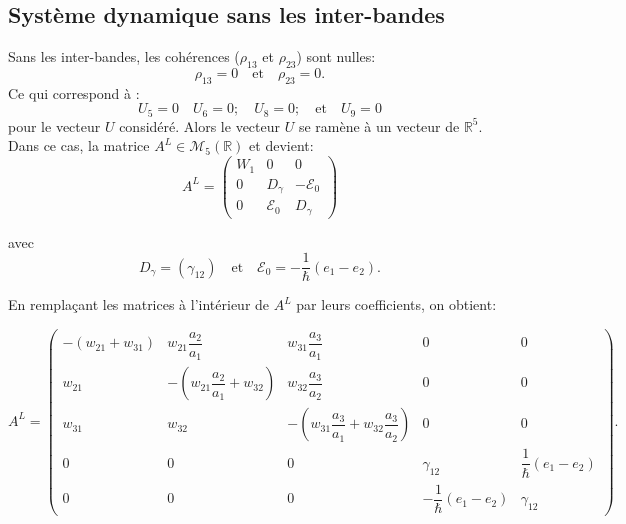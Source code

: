 \documentclass[12pt,a4paper,openany,oneside]{book}
\begin{document}
{{{{{{\subsection{Système dynamique sans les inter-bandes}
Sans les inter-bandes, les cohérences ($\rho_{13}$ et $\rho_{23}$) sont nulles:  
$$\rho_{13}=0 \quad \textrm{et}\quad \rho_{23}=0 .$$
Ce qui correspond à :
$$ U_{5}=0 \quad U_{6}=0 ;\quad U_{8}=0 ; \quad \textrm{et}\quad U_{9}=0$$
pour le vecteur $ U $ considéré. 
 Alors le vecteur $ U $ se ramène à un vecteur de $ \mathbb{R}^{5}$.\\
 Dans ce cas, la matrice $ A^{L}\in \mathcal{M}_{5}(\mathbb{R})$ et devient:
 \begin{equation}\label{AL sans interbande} 
A^{L}=
\begin{pmatrix}
W_{1} &      0           & 0                       \\
    0 & D_{\gamma}       &  -\mathcal{E}_{0}       \\
    0 & \mathcal{E}_{0}  &  D_{\gamma}
\end{pmatrix}
\end{equation}

avec 
$$ D_{\gamma} = (\gamma_{12}) \quad \textrm{et}\quad \mathcal{E}_{0} = - \dfrac{1}{\hbar}(e_{1}-e_{2}). $$

En remplaçant les matrices à l'intérieur de $ A^{L}$ par leurs coefficients, on obtient:
\begin{small}
 $$
A^{L}=
\begin{pmatrix}
-(w_{21} + w_{31}) & w_{21}\dfrac{a_{2}}{a_{1}} & w_{31}\dfrac{a_{3}}{a_{1}} & 0 & 0 \\
w_{21} & -(w_{21}\dfrac{a_{2}}{a_{1}} + w_{32}) & w_{32}\dfrac{a_{3}}{a_{2}} & 0 & 0 \\
w_{31} & w_{32} & -(w_{31}\dfrac{a_{3}}{a_{1}} + w_{32}\dfrac{a_{3}}{a_{2}}) & 0 & 0 \\
0 & 0 & 0 & \gamma_{12} & \dfrac{1}{\hbar}(e_{1}-e_{2})\\
0 & 0 & 0 & -\dfrac{1}{\hbar}(e_{1}-e_{2}) & \gamma_{12}
\end{pmatrix}.
$$
\end{small}

}}}}}}
\end{document}
